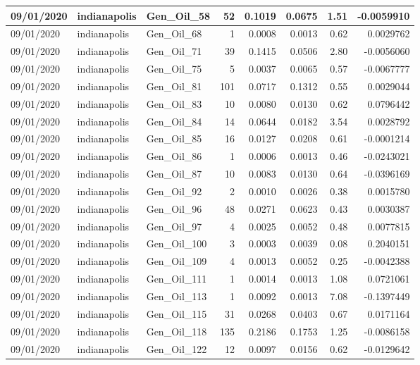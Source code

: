 \documentclass[
  letterpaper,
  DIV=11,
  numbers=noendperiod]{scrartcl}
\begin{document}
\begin{tabular}{l|l|l|r|r|r|r|r}
\hline
09/01/2020 & indianapolis & Gen\_Oil\_58 & 52 & 0.1019 & 0.0675 & 1.51 & -0.0059910\\
\hline
09/01/2020 & indianapolis & Gen\_Oil\_68 & 1 & 0.0008 & 0.0013 & 0.62 & 0.0029762\\
\hline
09/01/2020 & indianapolis & Gen\_Oil\_71 & 39 & 0.1415 & 0.0506 & 2.80 & -0.0056060\\
\hline
09/01/2020 & indianapolis & Gen\_Oil\_75 & 5 & 0.0037 & 0.0065 & 0.57 & -0.0067777\\
\hline
09/01/2020 & indianapolis & Gen\_Oil\_81 & 101 & 0.0717 & 0.1312 & 0.55 & 0.0029044\\
\hline
09/01/2020 & indianapolis & Gen\_Oil\_83 & 10 & 0.0080 & 0.0130 & 0.62 & 0.0796442\\
\hline
09/01/2020 & indianapolis & Gen\_Oil\_84 & 14 & 0.0644 & 0.0182 & 3.54 & 0.0028792\\
\hline
09/01/2020 & indianapolis & Gen\_Oil\_85 & 16 & 0.0127 & 0.0208 & 0.61 & -0.0001214\\
\hline
09/01/2020 & indianapolis & Gen\_Oil\_86 & 1 & 0.0006 & 0.0013 & 0.46 & -0.0243021\\
\hline
09/01/2020 & indianapolis & Gen\_Oil\_87 & 10 & 0.0083 & 0.0130 & 0.64 & -0.0396169\\
\hline
09/01/2020 & indianapolis & Gen\_Oil\_92 & 2 & 0.0010 & 0.0026 & 0.38 & 0.0015780\\
\hline
09/01/2020 & indianapolis & Gen\_Oil\_96 & 48 & 0.0271 & 0.0623 & 0.43 & 0.0030387\\
\hline
09/01/2020 & indianapolis & Gen\_Oil\_97 & 4 & 0.0025 & 0.0052 & 0.48 & 0.0077815\\
\hline
09/01/2020 & indianapolis & Gen\_Oil\_100 & 3 & 0.0003 & 0.0039 & 0.08 & 0.2040151\\
\hline
09/01/2020 & indianapolis & Gen\_Oil\_109 & 4 & 0.0013 & 0.0052 & 0.25 & -0.0042388\\
\hline
09/01/2020 & indianapolis & Gen\_Oil\_111 & 1 & 0.0014 & 0.0013 & 1.08 & 0.0721061\\
\hline
09/01/2020 & indianapolis & Gen\_Oil\_113 & 1 & 0.0092 & 0.0013 & 7.08 & -0.1397449\\
\hline
09/01/2020 & indianapolis & Gen\_Oil\_115 & 31 & 0.0268 & 0.0403 & 0.67 & 0.0171164\\
\hline
09/01/2020 & indianapolis & Gen\_Oil\_118 & 135 & 0.2186 & 0.1753 & 1.25 & -0.0086158\\
\hline
09/01/2020 & indianapolis & Gen\_Oil\_122 & 12 & 0.0097 & 0.0156 & 0.62 & -0.0129642\\

\end{tabular}
\end{document}
